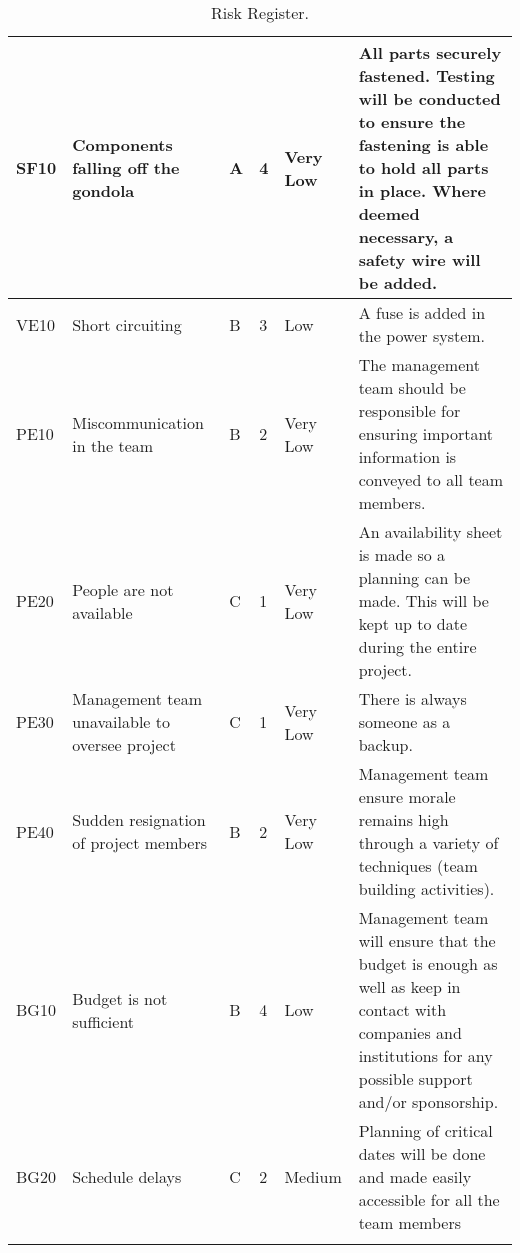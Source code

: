 \begin{longtable}{|m{}| m{} |m{} |m{}|m{}| m{}|}
SF10 & Components falling off the gondola									& A & 4 & \cellcolor[HTML]{34FF34}Very Low	& All parts securely fastened. Testing will be conducted to ensure the fastening is able to hold all parts in place. Where deemed necessary, a safety wire will be added.\\\hline

VE10 & Short circuiting														& B & 3 & \cellcolor[HTML]{FCFF2F}Low			& A fuse is added in the power system.\\\hline

PE10 & Miscommunication in the team											& B & 2 & \cellcolor[HTML]{34FF34}Very Low	& The management team should be responsible for ensuring important information is conveyed to all team members.\\\hline

PE20 & People are not available												& C & 1 & \cellcolor[HTML]{34FF34}Very Low	& An availability sheet is made so a planning can be made. This will be kept up to date during the entire project.\\\hline

PE30 & Management team unavailable to oversee project						& C & 1 & \cellcolor[HTML]{34FF34}Very Low	& There is always someone as a backup.\\\hline

PE40 & Sudden resignation of project members								& B & 2 & \cellcolor[HTML]{34FF34}Very Low	& Management team ensure morale remains high through a variety of techniques (team building activities).\\\hline

BG10 & Budget is not sufficient & B & 4 & \cellcolor[HTML]{FCFF2F}Low & Management team will ensure that the budget is enough as well as keep in contact with companies and institutions for any possible support and/or sponsorship. \\ \hline

BG20 & Schedule delays & C & 2 & \cellcolor[HTML]{F39C12} Medium & Planning of critical dates will be done and made easily accessible for all the team members \\ \hline



\caption{Risk Register.}
\label{tab:risk-register}
\end{longtable}
\raggedbottom